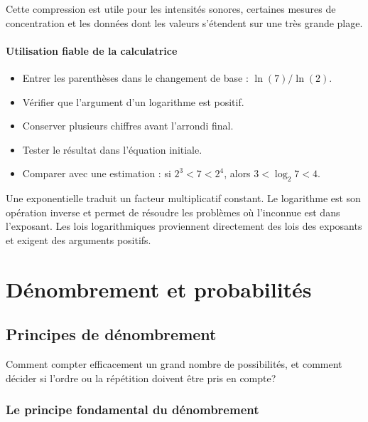 \documentclass[12pt,a4paper,openany]{book}
\begin{document}
Cette compression est utile pour les intensités sonores, certaines mesures de concentration et les données dont les valeurs s'étendent sur une très grande plage.

\subsection{Utilisation fiable de la calculatrice}

\begin{itemize}
\item Entrer les parenthèses dans le changement de base : $\ln(7)/\ln(2)$.
\item Vérifier que l'argument d'un logarithme est positif.
\item Conserver plusieurs chiffres avant l'arrondi final.
\item Tester le résultat dans l'équation initiale.
\item Comparer avec une estimation : si $2^3<7<2^4$, alors $3<\log_2 7<4$.
\end{itemize}

\begin{summarybox}
Une exponentielle traduit un facteur multiplicatif constant. Le logarithme est son opération inverse et permet de résoudre les problèmes où l'inconnue est dans l'exposant. Les lois logarithmiques proviennent directement des lois des exposants et exigent des arguments positifs.
\end{summarybox}


\part{Dénombrement et probabilités}

\chapter{Principes de dénombrement}

\begin{questionbox}
Comment compter efficacement un grand nombre de possibilités, et comment décider si l'ordre ou la répétition doivent être pris en compte?
\end{questionbox}

\section{Le principe fondamental du dénombrement}
\end{document}
